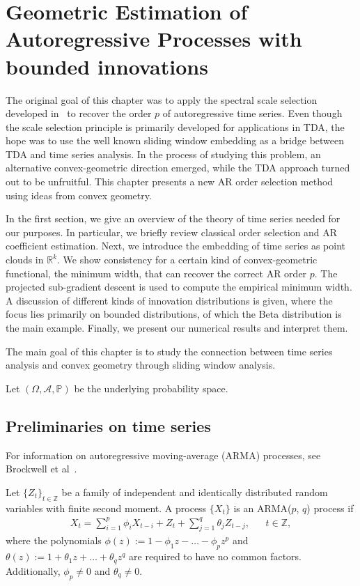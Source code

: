 \chapter{Geometric Estimation of Autoregressive Processes with bounded innovations}\label{chap:ar}

The original goal of this chapter was to apply the spectral scale selection developed in~\cite{Baralic2026} to recover the order $p$ of autoregressive time series. Even though the scale selection principle is primarily developed for applications in TDA, the hope was to use the well known sliding window embedding as a bridge between TDA and time series analysis. In the process of studying this problem, an alternative convex-geometric direction emerged, while the TDA approach turned out to be unfruitful. This chapter presents a new AR order selection method using ideas from convex geometry.

In the first section, we give an overview of the theory of time series needed for our purposes. In particular, we briefly review classical order selection and AR coefficient estimation. Next, we introduce the embedding of time series as point clouds in $\mathbb{R}^k$. We show consistency for a certain kind of convex-geometric functional, the minimum width, that can recover the correct AR order $p$. The projected sub-gradient descent is used to compute the empirical minimum width. A discussion of different kinds of innovation distributions is given, where the focus lies primarily on bounded distributions, of which the Beta distribution is the main example. Finally, we present our numerical results and interpret them.

The main goal of this chapter is to study the connection between time series analysis and convex geometry through sliding window analysis.

Let $(\Omega,\mathcal{A},\mathbb{P})$ be the underlying probability space.

\section{Preliminaries on time series}

For information on autoregressive moving-average (ARMA) processes, see Brockwell et al~\cite[Chapter~3]{brockwell2016introduction}.

\begin{Def}
    Let $\{Z_t\}_{t\in\mathbb{Z}}$ be a family of independent and identically distributed random variables with finite second moment. A process $\{X_t\}$ is an ARMA($p$, $q$) process if
    \begin{align}\label{eq:def_arma}
        X_t=\sum_{i=1}^{p}\phi_iX_{t-i}+Z_t+\sum_{j=1}^{q}\theta_jZ_{t-j}, && t\in\mathbb{Z},
    \end{align}
    where the polynomials $\phi(z):=1-\phi_1z-\dots-\phi_pz^{p}$ and $\theta(z):=1+\theta_1z+\dots+\theta_qz^{q}$ are required to have no common factors. Additionally, $\phi_p\neq0$ and $\theta_q\neq0$.
\end{Def}

